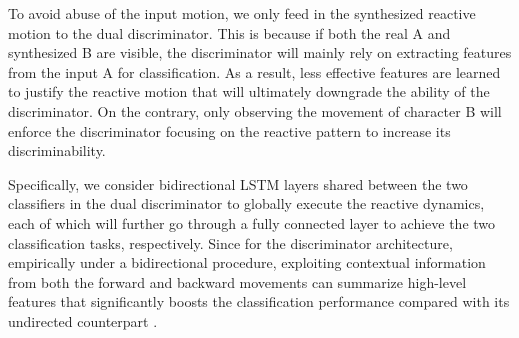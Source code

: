 \documentclass[times,twocolumn,final]{elsarticle}
\begin{document}
To avoid abuse of the input motion, we only feed in the synthesized reactive motion to the dual discriminator. This is because if both the real A and synthesized B are visible, the discriminator will mainly rely on extracting features from the input A for classification. As a result, less effective features are learned to justify the reactive motion that will ultimately downgrade the ability of the discriminator. On the contrary, only observing the movement of character B will enforce the discriminator focusing on the reactive pattern to increase its discriminability. 

Specifically, we consider bidirectional LSTM layers shared between the two classifiers in the dual discriminator to globally execute the reactive dynamics, each of which will further go through a fully connected layer to achieve the two classification tasks, respectively. Since for the discriminator architecture, empirically under a bidirectional procedure, exploiting contextual information from both the forward and backward movements can summarize high-level features that significantly boosts the classification performance compared with its undirected counterpart \cite{zhang2015bidirectional}. 
\end{document}
